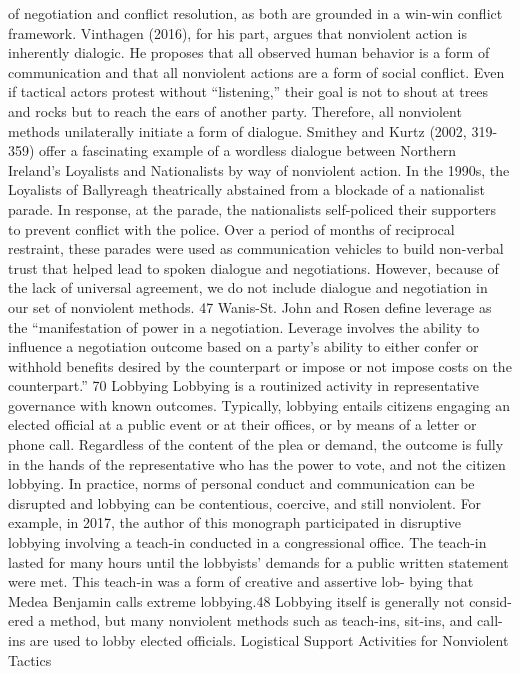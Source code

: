 \documentclass[twoside,a4paper,12pt,fleqn,openany]{extbook}
\begin{document}
of negotiation and conflict resolution, as both are grounded in a win-win conflict framework.
Vinthagen (2016), for his part, argues that nonviolent action is inherently dialogic. He proposes
that all observed human behavior is a form of communication and that all nonviolent actions
are a form of social conflict. Even if tactical actors protest without “listening,” their goal is not
to shout at trees and rocks but to reach the ears of another party. Therefore, all nonviolent
methods unilaterally initiate a form of dialogue.
Smithey and Kurtz (2002, 319-359) offer a fascinating example of a wordless dialogue
between Northern Ireland’s Loyalists and Nationalists by way of nonviolent action. In the
1990s, the Loyalists of Ballyreagh theatrically abstained from a blockade of a nationalist
parade. In response, at the parade, the nationalists self-policed their supporters to prevent
conflict with the police. Over a period of months of reciprocal restraint, these parades were
used as communication vehicles to build non-verbal trust that helped lead to spoken dialogue
and negotiations.
However, because of the lack of universal agreement, we do not include dialogue and
negotiation in our set of nonviolent methods.
47
Wanis-St. John and Rosen define leverage as the “manifestation of power in a negotiation. Leverage involves the
ability to influence a negotiation outcome based on a party’s ability to either confer or withhold benefits desired
by the counterpart or impose or not impose costs on the counterpart.”
70
Lobbying
Lobbying is a routinized activity in representative governance with known outcomes. Typically,
lobbying entails citizens engaging an elected official at a public event or at their offices, or
by means of a letter or phone call. Regardless of the content of the plea or demand, the
outcome is fully in the hands of the representative who has the power to vote, and not the
citizen lobbying. In practice, norms of personal conduct and communication can be disrupted
and lobbying can be contentious, coercive, and still nonviolent. For example, in 2017, the
author of this monograph participated in disruptive lobbying involving a teach-in conducted
in a congressional office. The teach-in lasted for many hours until the lobbyists’ demands for
a public written statement were met. This teach-in was a form of creative and assertive lob-
bying that Medea Benjamin calls extreme lobbying.48 Lobbying itself is generally not consid-
ered a method, but many nonviolent methods such as teach-ins, sit-ins, and call-ins are used
to lobby elected officials.
Logistical Support Activities for Nonviolent Tactics
\end{document}
